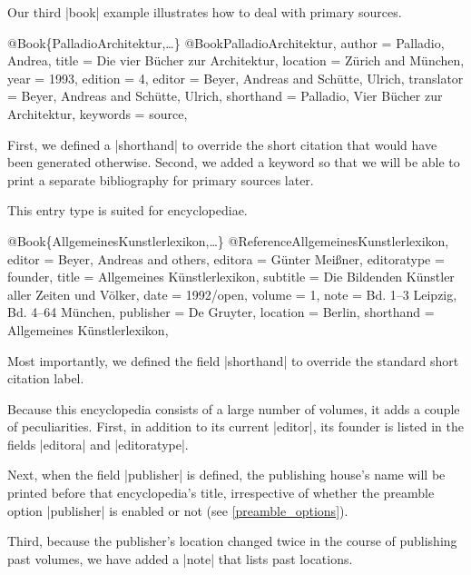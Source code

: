 \documentclass[a4paper,
10pt,
ngerman,
english
]{ltxdoc}
\begin{document}
Our third |book| example illustrates how to deal with primary sources.
\begin{bibexample}[label=PalladioArchitektur]{{@}Book\{PalladioArchitektur,…\}}
@Book{PalladioArchitektur,
  author     = {Palladio, Andrea},
  title      = {Die vier Bücher zur Architektur},
  location   = {Zürich and München},
  year       = {1993},
  edition    = {4},
  editor     = {Beyer, Andreas and Schütte, Ulrich},
  translator = {Beyer, Andreas and Schütte, Ulrich},
  shorthand  = {Palladio, Vier Bücher zur Architektur},
  keywords   = {source},
}
\end{bibexample}
First, we defined a |shorthand| to override the short citation that would have been generated otherwise. 
Second, we added a keyword so that we will be able to print a separate bibliography for primary sources later.

This entry type is suited for encyclopediae.
\begin{bibexample}[label=AllgemeinesKunstlerlexikon]{{@}Book\{AllgemeinesKunstlerlexikon,…\}}
@Reference{AllgemeinesKunstlerlexikon,
  editor      = {Beyer, Andreas and others},
  editora     = {Günter Meißner},
  editoratype = {founder},
  title       = {Allgemeines Künstlerlexikon},
  subtitle    = {Die Bildenden Künstler aller Zeiten und Völker},
  date        = {1992/open},
  volume      = {1\psqq},
  note        = {Bd. 1--3 Leipzig, Bd. 4--64 München},
  publisher   = {De Gruyter},
  location    = {Berlin},
  shorthand   = {Allgemeines Künstlerlexikon},
}
\end{bibexample}
Most importantly, we defined the field |shorthand| to override the standard short citation label.

Because this encyclopedia consists of a large number of volumes, it adds a couple of peculiarities. 
First, in addition to its current |editor|, its founder is listed in the fields |editora| and |editoratype|.

Next, when the field |publisher| is defined, the publishing house's name will be printed before that encyclopedia's title, 
irrespective of whether the preamble option |publisher| is enabled or not (see \cref{preamble_options}).

Third, because the publisher's location changed twice in the course of publishing past volumes, we have added a |note| that lists past locations.
\end{document}
